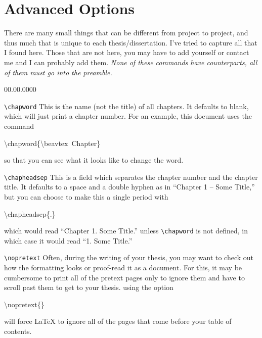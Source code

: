 \section{Advanced Options\label{sec:Advanced-Options}}

There are many small things that can be different from project to
project, and thus much that is unique to each thesis/dissertation.
I've tried to capture all that I found here. Those that are not here,
you may have to add yourself or contact me and I can probably add
them. \emph{None of these commands have \LyX{} counterparts, all of
them must go into the preamble.}

\begin{lyxlist}{00.00.0000}
\item [\texttt{\textbackslash{}chapword}]This is the name (not the title)
of all chapters. It defaults to blank, which will just print a chapter
number. For an example, this document uses the command

\begin{lyxcode}
\textbackslash{}chapword\{\textbackslash{}beavtex~Chapter\}
\end{lyxcode}
so that you can see what it looks like to change the word.

\item [\texttt{\textbackslash{}chapheadsep}]This is a field which separates
the chapter number and the chapter title. It defaults to a space and
a double hyphen as in {}``Chapter 1 -- Some Title,'' but you can
choose to make this a single period with

\begin{lyxcode}
\textbackslash{}chapheadsep\{.\}
\end{lyxcode}
which would read {}``Chapter 1. Some Title.'' unless \texttt{\textbackslash{}chapword}
is not defined, in which case it would read {}``1. Some Title.''

\item [\texttt{\textbackslash{}nopretext}]Often, during the writing of
your thesis, you may want to check out how the formatting looks or
proof-read it as a document. For this, it may be cumbersome to print
all of the pretext pages only to ignore them and have to scroll past
them to get to your thesis. using the option

\begin{lyxcode}
\textbackslash{}nopretext\{\}
\end{lyxcode}
will force \LaTeX{} to ignore all of the pages that come before your
table of contents.


\end{lyxlist}
